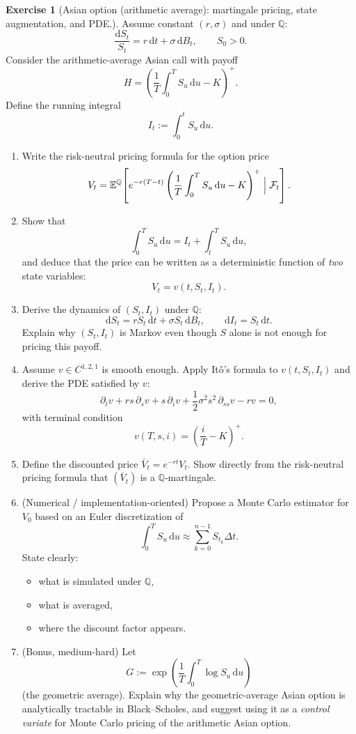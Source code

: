 \documentclass[11pt]{article}
\newcommand{\E}{\mathbb{E}}
\newcommand{\F}{\mathcal{F}}
\newcommand{\1}{\mathbf{1}}
\theoremstyle{definition}
\newtheorem{exercise}{Exercise}[section]
\begin{document}
\begin{exercise}[Asian option (arithmetic average): martingale pricing, state augmentation, and PDE.]
Assume constant $(r,\sigma)$ and under $\mathbb{Q}$:
$$
\frac{\mathrm{d}S_t}{S_t}=r\,\mathrm{d}t+\sigma\,\mathrm{d}B_t,
\qquad S_0>0.
$$
Consider the arithmetic-average Asian call with payoff
$$
H=\left(\frac1T\int_0^T S_u\,\mathrm{d}u-K\right)^+.
$$
Define the running integral
$$
I_t:=\int_0^t S_u\,\mathrm{d}u.
$$

\begin{enumerate}[leftmargin=1.2em, label=(\alph*), itemsep=0.3em]
\item Write the risk-neutral pricing formula for the option price
$$
V_t=\E^\mathbb{Q}\!\left[e^{-r(T-t)}\left(\frac1T\int_0^T S_u\,\mathrm{d}u-K\right)^+\Bigm|\F_t\right].
$$

\item Show that
$$
\int_0^T S_u\,\mathrm{d}u=I_t+\int_t^T S_u\,\mathrm{d}u,
$$
and deduce that the price can be written as a deterministic function of \emph{two} state variables:
$$
V_t=v(t,S_t,I_t).
$$

\item Derive the dynamics of $(S_t,I_t)$ under $\mathbb{Q}$:
$$
\mathrm{d}S_t=rS_t\,\mathrm{d}t+\sigma S_t\,\mathrm{d}B_t,
\qquad
\mathrm{d}I_t=S_t\,\mathrm{d}t.
$$
Explain why $(S_t,I_t)$ is Markov even though $S$ alone is not enough for pricing this payoff.

\item Assume $v\in C^{1,2,1}$ is smooth enough. Apply It\^o's formula to $v(t,S_t,I_t)$ and derive the PDE satisfied by $v$:
$$
\partial_t v + rs\,\partial_s v + s\,\partial_i v + \frac12\sigma^2 s^2\,\partial_{ss}v - rv=0,
$$
with terminal condition
$$
v(T,s,i)=\left(\frac{i}{T}-K\right)^+.
$$

\item Define the discounted price $\bar V_t=e^{-rt}V_t$. Show directly from the risk-neutral pricing formula that $(\bar V_t)$ is a $\mathbb{Q}$-martingale.

\item (Numerical / implementation-oriented) Propose a Monte Carlo estimator for $V_0$ based on an Euler discretization of
$$
\int_0^T S_u\,\mathrm{d}u
\approx \sum_{k=0}^{n-1} S_{t_k}\Delta t.
$$
State clearly:
\begin{itemize}[leftmargin=1.2em]
\item what is simulated under $\mathbb{Q}$,
\item what is averaged,
\item where the discount factor appears.
\end{itemize}

\item (Bonus, medium-hard) Let
$$
G:=\exp\!\left(\frac1T\int_0^T \log S_u\,\mathrm{d}u\right)
$$
(the geometric average). Explain why the geometric-average Asian option is analytically tractable in Black--Scholes, and suggest using it as a \emph{control variate} for Monte Carlo pricing of the arithmetic Asian option.
\end{enumerate}
\end{exercise}
\end{document}
